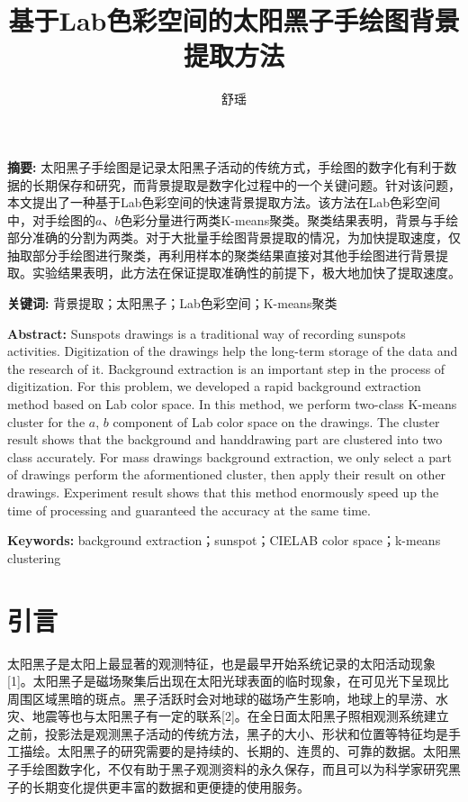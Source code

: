 \documentclass[UTF8,a4paper,twoside]{ctexart}
\title{基于Lab色彩空间的太阳黑子手绘图背景提取方法}
\author{舒瑶}
\date{}
\begin{document}
\maketitle

\textbf{摘要: }太阳黑子手绘图是记录太阳黑子活动的传统方式，手绘图的数字化有利于数据的长期保存和研究，而背景提取是数字化过程中的一个关键问题。针对该问题，本文提出了一种基于Lab色彩空间的快速背景提取方法。该方法在Lab色彩空间中，对手绘图的$a$、$b$色彩分量进行两类K-means聚类。聚类结果表明，背景与手绘部分准确的分割为两类。对于大批量手绘图背景提取的情况，为加快提取速度，仅抽取部分手绘图进行聚类，再利用样本的聚类结果直接对其他手绘图进行背景提取。实验结果表明，此方法在保证提取准确性的前提下，极大地加快了提取速度。

\textbf{关键词: }背景提取；太阳黑子；Lab色彩空间；K-means聚类

\textbf{Abstract: }Sunspots drawings is a traditional way of recording sunspots activities. Digitization of the drawings help the long-term storage of the data and the research of it. Background extraction is an important step in the process of digitization. For this problem, we developed a rapid background extraction method based on Lab color space. In this method, we perform two-class K-means cluster for the $a$, $b$ component of Lab color space on the drawings. The cluster result shows that the background and handdrawing part are clustered into two class accurately. For mass drawings background extraction, we only select a part of drawings perform the aformentioned cluster, then apply their result on other drawings. Experiment result shows that this method enormously speed up the time of processing and guaranteed the accuracy at the same time.

\textbf{Keywords: }background extraction；sunspot；CIELAB color space；k-means clustering

\section{引言}
太阳黑子是太阳上最显著的观测特征，也是最早开始系统记录的太阳活动现象[1]。太阳黑子是磁场聚集后出现在太阳光球表面的临时现象，在可见光下呈现比周围区域黑暗的斑点。黑子活跃时会对地球的磁场产生影响，地球上的旱涝、水灾、地震等也与太阳黑子有一定的联系[2]。在全日面太阳黑子照相观测系统建立之前，投影法是观测黑子活动的传统方法，黑子的大小、形状和位置等特征均是手工描绘。太阳黑子的研究需要的是持续的、长期的、连贯的、可靠的数据。太阳黑子手绘图数字化，不仅有助于黑子观测资料的永久保存，而且可以为科学家研究黑子的长期变化提供更丰富的数据和更便捷的使用服务。
\end{document}
